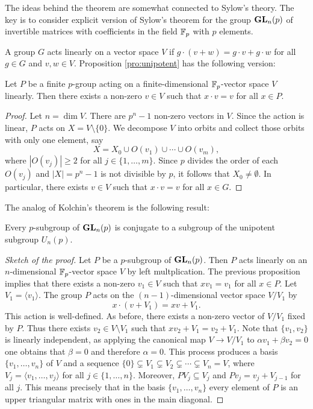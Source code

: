 The ideas behind the theorem are somewhat connected to Sylow's  theory. The key is to consider explicit version of Sylow's theorem for the group $\mathbf{GL}_n(p)$ of invertible matrices 
with coefficients in the field $\mathbb{F}_p$ with $p$ elements. 

A group $G$ acts linearly on a vector space $V$ 
if $g\cdot (v+w)=g\cdot v+g\cdot w$
for all $g\in G$ and $v,w\in V$.
Proposition \ref{pro:unipotent} has the following
version:

\begin{proposition}
Let $P$ be a finite $p$-group acting on a finite-dimensional $\mathbb{F}_p$-vector space 
$V$ linearly. Then there exists a non-zero $v\in V$ 
such that $x\cdot v=v$ for all $x\in P$. 
\end{proposition}

\begin{proof}
    Let $n=\dim V$. There are $p^n-1$ non-zero vectors 
    in $V$. Since the action is linear, 
    $P$ acts  
    on $X=V\setminus\{0\}$. We decompose $V$ into orbits
    and collect those orbits with only one element, say 
    \[
    X=X_0\cup O(v_1)\cup \cdots\cup O(v_m),
    \]
    where $|O(v_j)|\geq 2$ for all $j\in\{1,\dots,m\}$. 
    Since 
    $p$ divides the order of each $O(v_j)$ and 
    $|X|=p^n-1$ is not divisible by $p$, 
    it follows that $X_0\ne\emptyset$. In particular, 
    there exists $v\in V$ such that $x\cdot v=v$ for
    all $x\in G$. 
\end{proof}

The analog of Kolchin's theorem is the following result:

\begin{proposition}
\label{pro:Kolchin}
    Every $p$-subgroup of $\mathbf{GL}_n(p)$ is conjugate to a subgroup
    of the unipotent subgroup $U_n(p)$. 
\end{proposition}

\begin{proof}[Sketch of the proof]
    Let $P$ be a $p$-subgroup of $\mathbf{GL}_n(p)$. 
    Then $P$ acts linearly on an $n$-dimensional 
    $\mathbb{F}_p$-vector space $V$ by left multplication. 
    The previous
    proposition implies that there exists a non-zero
    $v_1\in V$
    such that $xv_1=v_1$ for all $x\in P$. Let 
    $V_1=\langle v_1\rangle$. The group $P$ 
    acts on the $(n-1)$-dimensional vector space 
    $V/V_1$ by 
    \[
    x\cdot (v+V_1)=xv+V_1.
    \]
    This action is well-defined. 
    As before, there exists a non-zero 
    vector of $V/V_1$ fixed by $P$. Thus 
    there exists $v_2\in V\setminus V_1$ such that 
    $xv_2+V_1=v_2+V_1$. Note that $\{v_1,v_2\}$ is linearly
    independent, as applying the canonical
    map $V\to V/V_1$ to 
    $\alpha v_1+\beta v_2=0$ one obtains
    that $\beta=0$ and therefore $\alpha=0$. This process
    produces a basis $\{v_1,\dots,v_n\}$ 
    of $V$ and a sequence $\{0\}\subsetneq V_1\subsetneq V_2\subsetneq\cdots\subsetneq V_n=V$, where 
    $V_j=\langle v_1,\dots,v_j\rangle$ for all $j\in\{1,\dots,n\}$. Moreover,  
    $PV_j\subseteq V_j$  and 
    $Pv_j=v_j+V_{j-1}$ for all $j$. This
    means precisely that in the basis 
    $\{v_1,\dots,v_n\}$ 
    every element of $P$ is an upper triangular
    matrix with ones in the main diagonal. 
\end{proof}

